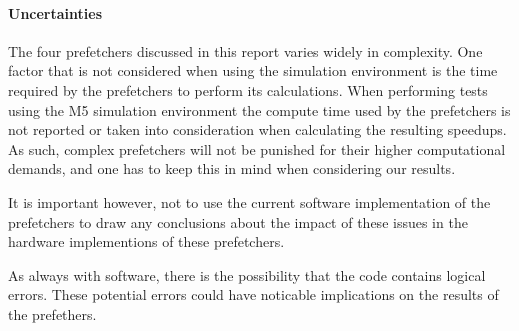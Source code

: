 \paragraph{Uncertainties}
\label{"waiting for reftex-label call..."}
The four prefetchers discussed in this report varies widely in
complexity. One factor that is not considered when using the
simulation environment is the time required by the prefetchers to
perform its calculations. When performing tests using the M5
simulation environment the compute time used by the prefetchers is not
reported or taken into consideration when calculating the resulting
speedups. As such, complex prefetchers will not be punished for their
higher computational demands, and one has to keep this in mind when
considering our results.

It is important however, not to use the current software
implementation of the prefetchers to draw any conclusions about the
impact of these issues in the hardware implementions of these
prefetchers.

As always with software, there is the possibility that the code
contains logical errors. These potential errors could have noticable
implications on the results of the prefethers.
